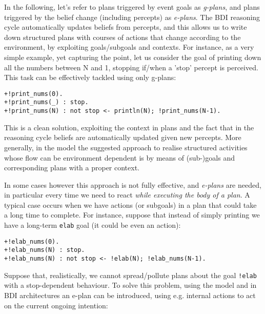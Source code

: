 %
%
%
In the following, let's refer to plans triggered by event goals
as \emph{g-plans}, and plans triggered by the
belief change (including percepts) as \emph{e-plans}.
%
The BDI reasoning cycle automatically updates beliefs from percepts,
and this allows us to write down structured plans with courses of
actions that change according to the environment, by exploiting
goals/subgoals and contexts.
%
For instance, as a very simple example, yet capturing the point, let us consider the goal of  printing down all the numbers between N and 1, stopping if/when a 'stop' percept is perceived. 
%
This task can be effectively tackled using only g-plans:

\begin{small}
\begin{verbatim}
+!print_nums(0).
+!print_nums(_) : stop.
+!print_nums(N) : not stop <- println(N); !print_nums(N-1).
\end{verbatim}
\end{small}
	
\noindent This is a clean solution, exploiting the context in plans
and the fact that in the reasoning cycle beliefs are automatically
updated given new percepts.
%
More generally, in the {\asl} model the suggested approach to realise
structured activities whose flow can be environment dependent is by
means of (sub-)goals and corresponding plans with a proper context.

In some cases however this approach is not fully effective, and
\emph{e-plans} are needed,
%
in particular every time we need to react \emph{while executing the
  body of a plan}.
%
A typical case occurs when we have actions (or subgoals) in a plan
that could take a long time to complete.
%
For instance, suppose that instead of simply printing we have a
long-term \texttt{elab} goal (it could be even an action):

\begin{small}
\begin{verbatim}
+!elab_nums(0).
+!elab_nums(N) : stop. 
+!elab_nums(N) : not stop <- !elab(N); !elab_nums(N-1).
\end{verbatim}
\end{small}

\noindent Suppose that, realistically, we cannot spread/pollute plans
about the goal \texttt{!elab} with a stop-dependent behaviour.
%
To solve this problem, using the {\asl} model and in BDI architectures
an e-plan can be introduced, using e.g. internal actions to act on the
current ongoing intention:

